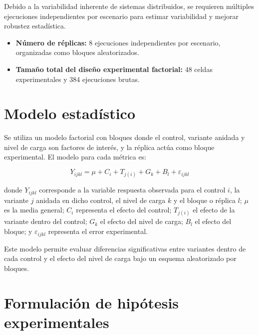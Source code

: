 Debido a la variabilidad inherente de sistemas distribuidos, se requieren múltiples ejecuciones independientes por escenario para estimar variabilidad y mejorar robustez estadística.

\begin{itemize}
\item \textbf{Número de réplicas:} 8 ejecuciones independientes por escenario, organizadas como bloques aleatorizados.
\item \textbf{Tamaño total del diseño experimental factorial:} 48 celdas experimentales y 384 ejecuciones brutas.
\end{itemize}



\section{Modelo estadístico}

Se utiliza un modelo factorial con bloques donde el control, variante anidada y nivel de carga son factores de interés, y la réplica actúa como bloque experimental. El modelo para cada métrica es:

\begin{equation}
Y_{ijkl} = \mu + C_i + T_{j(i)} + G_k + B_l + \varepsilon_{ijkl}
\end{equation}

donde $Y_{ijkl}$ corresponde a la variable respuesta observada para el control $i$, la variante $j$ anidada en dicho control, el nivel de carga $k$ y el bloque o réplica $l$; $\mu$ es la media general; $C_i$ representa el efecto del control; $T_{j(i)}$ el efecto de la variante dentro del control; $G_k$ el efecto del nivel de carga; $B_l$ el efecto del bloque; y $\varepsilon_{ijkl}$ representa el error experimental.

Este modelo permite evaluar diferencias significativas entre variantes dentro de cada control y el efecto del nivel de carga bajo un esquema aleatorizado por bloques.

\section{Formulación de hipótesis experimentales}

